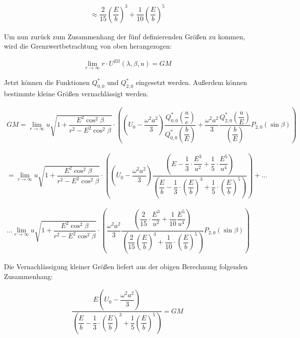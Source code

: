 \begin{align*}
\approx \dfrac{2}{15} \left(\dfrac{E}{b}\right)^3 + \dfrac{1}{10} \left(\dfrac{E}{b}\right)^5
\end{align*}

Um nun zurück zum Zusammenhang der fünf definierenden Größen zu kommen, wird die Grenzwertbetrachtung von oben herangezogen: 

\begin{align*}
\lim_{r \rightarrow \infty} r \cdot U^{Ell}(\lambda,\beta,u) = GM 
\end{align*}

Jetzt können die Funktionen $Q_{0,0}^{*}$ und $Q_{2,0}^{*}$ eingesetzt werden. Außerdem können bestimmte kleine Größen vernachlässigt werden. 

\begin{align*}
GM = \lim_{r \rightarrow \infty} u \sqrt{1 + \dfrac{E^2 \cos^2 \beta}{r^2 - E^2 \cos^2 \beta}} \cdot \left(\left(U_0 - \dfrac{\omega^2 a^2}{3}\right) \dfrac{Q_{0,0}^{*}\left(\dfrac{u}{e}\right)}{Q_{0,0}^{*}\left(\dfrac{b}{E}\right)} + \dfrac{\omega^2 a^2}{3} \dfrac{Q_{2,0}^{*}\left(\dfrac{u}{E}\right)}{\left(\dfrac{b}{E}\right)} P_{2,0} (\sin \beta)\right)
\end{align*}

\begin{gather*}
= \lim_{r \rightarrow \infty} u \sqrt{1 + \dfrac{E^2 \cos^2 \beta}{r^2 - E^2 \cos^2 \beta}} \cdot \left(\left(U_0 - \dfrac{\omega^2 a^2}{3}\right) \dfrac{\left(E - \dfrac{1}{3} \cdot \dfrac{E^3}{u^2} + \dfrac{1}{5} \cdot \dfrac{E^5}{u^4}\right)}{\left(\dfrac{E}{b} - \dfrac{1}{3} \cdot \left(\dfrac{E}{b}\right)^3 + \dfrac{1}{5} \cdot \left(\dfrac{E}{b}\right)^5\right)} \right) + ...
\end{gather*}

\begin{gather*}
... \lim_{r \rightarrow \infty} u \sqrt{1 + \dfrac{E^2 \cos^2 \beta}{r^2 - E^2 \cos^2 \beta}} \cdot \left( \dfrac{\omega^2 a^2}{3} \dfrac{\left(\dfrac{2}{15} \cdot \dfrac{E^3}{u^2} + \dfrac{1}{10} \dfrac{E^5}{u^4}\right)}{\left(\dfrac{2}{15} \left(\dfrac{E}{b}\right)^3 + \dfrac{1}{10} \cdot \left(\dfrac{E}{b}\right)^5\right)}P_{2,0}(\sin \beta)\right)
\end{gather*}

Die Vernachlässigung kleiner Größen liefert aus der obigen Berechnung folgenden Zusammenhang:

\begin{gather}
\dfrac{E \left(U_0 - \dfrac{\omega^2 a^2}{3}\right)}{\left(\dfrac{E}{b} - \dfrac{1}{3} \cdot \left(\dfrac{E}{b}\right)^3 + \dfrac{1}{5} \left(\dfrac{E}{b}\right)^5\right)} = GM
\end{gather}

